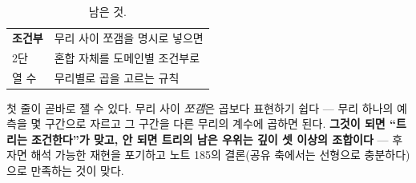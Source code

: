 \documentclass[10pt]{article}
\begin{document}
\begin{table}[t]
\centering\tsize
\caption{남은 것.}
\begin{tabular}{ll}
\toprule
\textbf{조건부} & 무리 사이 쪼갬을 명시로 넣으면 \\
2단 & 혼합 자체를 도메인별 조건부로 \\
열 수 & 무리별로 곱을 고르는 규칙 \\
\bottomrule
\end{tabular}
\end{table}

첫 줄이 곧바로 잴 수 있다. 무리 사이 \emph{쪼갬}은 곱보다 표현하기 쉽다 ---
무리 하나의 예측을 몇 구간으로 자르고 그 구간을 다른 무리의 계수에
곱하면 된다. \textbf{그것이 되면 ``트리는 조건한다''가 맞고, 안 되면 트리의
남은 우위는 깊이 셋 이상의 조합이다} --- 후자면 해석 가능한 재현을 포기하고
노트 185의 결론(공유 축에서는 선형으로 충분하다)으로 만족하는 것이 맞다.
\end{document}
